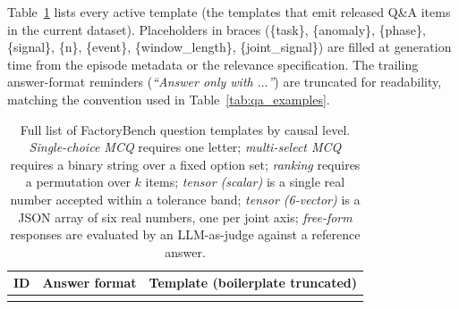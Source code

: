Table~\ref{tab:template_list} lists every active template (the templates that emit released Q\&A items in the current dataset). Placeholders in braces (\{task\}, \{anomaly\}, \{phase\}, \{signal\}, \{n\}, \{event\}, \{window\_length\}, \{joint\_signal\}) are filled at generation time from the episode metadata or the relevance specification. The trailing answer-format reminders (\emph{``Answer only with $\ldots$''}) are truncated for readability, matching the convention used in Table~\ref{tab:qa_examples}.

\begin{small}
    \renewcommand{\arraystretch}{1.4}
    \begin{longtable}{@{}>{\centering\arraybackslash}p{}>{\raggedright\arraybackslash}p{}>{\raggedright\arraybackslash}p{}@{}}
        \caption{Full list of FactoryBench question templates by causal level. \emph{Single-choice MCQ} requires one letter; \emph{multi-select MCQ} requires a binary string over a fixed option set; \emph{ranking} requires a permutation over $k$ items; \emph{tensor (scalar)} is a single real number accepted within a tolerance band; \emph{tensor (6-vector)} is a JSON array of six real numbers, one per joint axis; \emph{free-form} responses are evaluated by an LLM-as-judge against a reference answer.}\label{tab:template_list} \\
        \toprule
        \textbf{ID} & \textbf{Answer format} & \textbf{Template (boilerplate truncated)}                                                                                                                                                                                                                                                                                                                                                                                                                                                          \\
        \midrule
        \endfirsthead
        \multicolumn{3}{@{}l}{\footnotesize\emph{Table~\ref{tab:template_list} continued from previous page}}                                                                                                                                                                                                                                                                                                                                                                                                                                     \\

\end{longtable}
\end{small}
